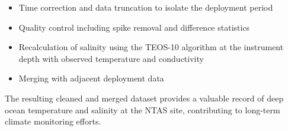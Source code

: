 \documentclass[11pt]{article}
\newcommand{\projectname}{NTAS}  %
\begin{document}
\begin{itemize}
    \item Time correction and data truncation to isolate the deployment period
    \item Quality control including spike removal and difference statistics
    \item Recalculation of salinity using the TEOS-10 algorithm at the instrument depth with observed temperature and conductivity
    \item Merging with adjacent deployment data %
\end{itemize}

The resulting cleaned and merged dataset provides a valuable record of deep ocean temperature and salinity 
at the \projectname{} site, contributing to long-term climate monitoring efforts.
\end{document}

